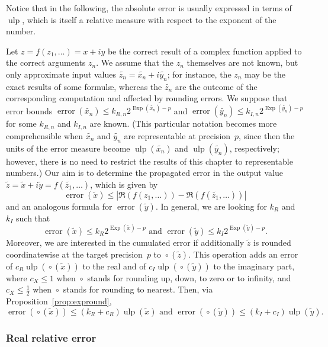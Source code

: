 \documentclass [12pt]{article}
\newcommand {\corr}[1]{{#1}}
\newcommand {\appro}[1]{\widetilde {#1}}
\newcommand {\Ulp}{{\operatorname {ulp}}}
\DeclareMathOperator{\Exp}{\operatorname {Exp}}
\newcommand{\error}{\operatorname {error}}
\newcommand {\round}{\operatorname {\circ}}
\renewcommand {\leq}{\leqslant}
\begin{document}
Notice that in the following, the absolute error is usually expressed in terms
of $\Ulp$, which is itself a relative measure with respect to the exponent of
the number.

Let $\corr z = f (\corr {z_1}, \ldots) = \corr x + i \corr y$ be the correct
result of a complex function applied to the correct arguments $\corr {z_n}$.
We assume that the $\corr {z_n}$ themselves are not known, but only
approximate input values $\appro {z_n} = \appro {x_n} + i \appro {y_n}$;
for instance, the $\corr {z_n}$ may be the exact results of some formul\ae,
whereas the $\appro {z_n}$ are the outcome of the corresponding computation
and affected by rounding errors. We suppose that error bounds
$\error (\appro {x_n}) \leq k_{R, n} 2^{\Exp (\appro {x_n}) - p}$
and $\error (\appro {y_n}) \leq k_{I, n} 2^{\Exp (\appro {y_n}) - p}$ for
some $k_{R, n}$ and $k_{I, n}$ are known. (This particular notation
becomes more comprehensible when $\appro {x_n}$ and $\appro {y_n}$ are
representable at precision~$p$, since then the units of the error measure
become $\Ulp (\appro {x_n})$ and $\Ulp (\appro {y_n})$, respectively;
however, there is no need to restrict the results of this chapter to
representable numbers.)
Our aim is to determine the propagated error in the output value
$\appro z = \appro x + i \appro y = f (\appro {z_1}, \ldots)$, which is given by
\begin {equation}
\label {eq:properror}
\error (\appro x)
\leq | \Re (f (\corr {z_1}, \ldots)) - \Re (f (\appro {z_1}, \ldots)) |
\end {equation}
and an analogous formula for $\error (\appro y)$. In general,
we are looking for $k_R$ and $k_I$ such that
\[
\error (\appro x) \leq k_R 2^{\Exp (\appro x) - p}
\text { and }
\error (\appro y) \leq k_I 2^{\Exp (\appro y) - p}.
\]
Moreover, we are interested in the cumulated error if additionally
$\appro z$ is rounded coordinatewise at the target precision~$p$
to $\round (\appro z)$. This operation adds an error of
$c_R \Ulp (\round (\appro x))$ to the real and of
$c_I \Ulp (\round (\appro y))$ to the imaginary part, where
$c_X \leq 1$ when $\round$ stands for rounding up, down, to zero or
to infinity, and $c_X \leq \frac {1}{2}$ when $\round$ stands for
rounding to nearest.
Then, via Proposition~\ref {prop:expround},
\[
\error (\round (\appro x)) \leq (k_R + c_R) \Ulp (\appro x)
\text { and }
\error (\round (\appro y)) \leq (k_I + c_I) \Ulp (\appro y).
\]


\subsubsection {Real relative error}
\end{document}
